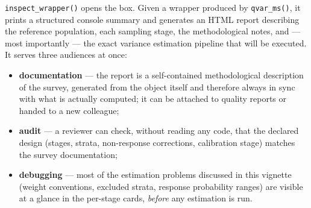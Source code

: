 \documentclass[
]{article}
\providecommand{\tightlist}{%
  \setlength{\itemsep}{0pt}\setlength{\parskip}{0pt}}
\begin{document}
\texttt{inspect\_wrapper()} opens the box. Given a wrapper produced by
\texttt{qvar\_ms()}, it prints a structured console summary and
generates an HTML report describing the reference population, each
sampling stage, the methodological notes, and --- most importantly ---
the exact variance estimation pipeline that will be executed. It serves
three audiences at once:

\begin{itemize}
\tightlist
\item
  \textbf{documentation} --- the report is a self-contained
  methodological description of the survey, generated from the object
  itself and therefore always in sync with what is actually computed; it
  can be attached to quality reports or handed to a new colleague;
\item
  \textbf{audit} --- a reviewer can check, without reading any code,
  that the declared design (stages, strata, non-response corrections,
  calibration stage) matches the survey documentation;
\item
  \textbf{debugging} --- most of the estimation problems discussed in
  this vignette (weight conventions, excluded strata, response
  probability ranges) are visible at a glance in the per-stage cards,
  \emph{before} any estimation is run.
\end{itemize}
\end{document}
